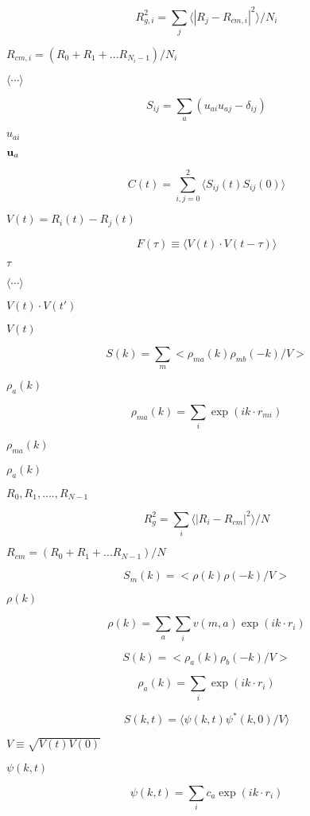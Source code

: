\documentclass{article}
\begin{document}
\[ R_{g,i}^2 = \sum_j \langle | R_j - R_{cm,i} |^2 \rangle / N_i \]
\pagebreak

$ R_{cm,i} = (R_0 + R_1 + ... R_{N_{i}-1})/N_i $
\pagebreak

$ \langle \cdots \rangle $
\pagebreak

\[ S_{ij} = \sum_{a}( u_{ai}u_{aj} - \delta_{ij} ) \]
\pagebreak

$u_{ai}$
\pagebreak

${\bf u}_{a}$
\pagebreak

\[ C(t) = \sum_{i,j=0}^{2} \langle S_{ij}(t)S_{ij}(0) \rangle \]
\pagebreak

$ V(t) = R_i(t) - R_j(t) $
\pagebreak

\[ F(\tau) \equiv \langle V(t) \cdot V(t-\tau) \rangle \]
\pagebreak

$ \tau $
\pagebreak

$ \langle \cdots \rangle$
\pagebreak

$ V(t) \cdot V(t') $
\pagebreak

$ V(t) $
\pagebreak

\[ S(k) = \sum_{m} < \rho_{ma}(k) \rho_{mb}(-k) / V > \]
\pagebreak

$\rho_a(k)$
\pagebreak

\[ \rho_{ma}(k) = \sum_{i} \exp( i k \cdot r_{mi} ) \]
\pagebreak

$ \rho_{ma}(k) $
\pagebreak

$ \rho_a(k) $
\pagebreak

$ R_0, R_1, ...., R_{N-1} $
\pagebreak

\[ R_g^2 = \sum_i \langle | R_i - R_{cm} |^2 \rangle / N \]
\pagebreak

$ R_{cm} = (R_0 + R_1 + ... R_{N-1})/N $
\pagebreak

\[ S_{m}(k) = < \rho(k) \rho(-k) / V > \]
\pagebreak

$\rho(k)$
\pagebreak

\[ \rho(k) = \sum_{a} \sum_{i} v(m, a)\exp( i k \cdot r_i ) \]
\pagebreak

\[ S(k) = < \rho_a(k) \rho_b(-k) / V > \]
\pagebreak

\[ \rho_a(k) = \sum_{i} \exp( i k \cdot r_i ) \]
\pagebreak

\[ S(k,t) = \langle \psi(k,t) \psi^{*}(k,0) / V \rangle \]
\pagebreak

$V \equiv \sqrt{V(t)V(0)}$
\pagebreak

$\psi(k,t)$
\pagebreak

\[ \psi(k,t) = \sum_{i} c_{a} \exp( i k \cdot r_i ) \]
\pagebreak
\end{document}
